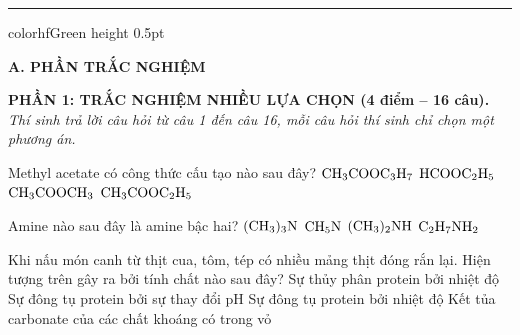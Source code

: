 \documentclass[11pt,a4paper]{article}
\begin{document}
\vspace{4pt}
\hrule color{hfGreen} height 0.5pt

\vspace{4pt}
\noindent
{\color{mainGreen}\textbf{\Large A. PHẦN TRẮC NGHIỆM}}

\vspace{3pt}
\noindent
{\color{mainGreen}\textbf{\large PHẦN 1: TRẮC NGHIỆM NHIỀU LỰA CHỌN (4 điểm – 16 câu).}}\\
\textit{\small Thí sinh trả lời câu hỏi từ câu 1 đến câu 16, mỗi câu hỏi thí sinh chỉ chọn một phương án.}
\vspace{2pt}

\begin{ex}
Methyl acetate có công thức cấu tạo nào sau đây?
\choice
{$\ce{CH3COOC3H7}$}
{$\ce{HCOOC2H5}$}
{\True $\ce{CH3COOCH3}$}
{$\ce{CH3COOC2H5}$}

\end{ex}
\begin{ex}
Amine nào sau đây là amine bậc hai?
\choice
{$\ce{(CH3)3N}$}
{$\ce{CH5N}$}
{\True $\ce{(CH3)2NH}$}
{$\ce{C2H7NH2}$}

\end{ex}
\begin{ex}
Khi nấu món canh từ thịt cua, tôm, tép có nhiều mảng thịt đóng rắn lại. Hiện tượng trên gây ra bởi tính chất nào sau đây?
\choice
{Sự thủy phân protein bởi nhiệt độ}
{Sự đông tụ protein bởi sự thay đổi pH}
{\True Sự đông tụ protein bởi nhiệt độ}
{Kết tủa carbonate của các chất khoáng có trong vỏ}

\end{ex}
\end{document}

